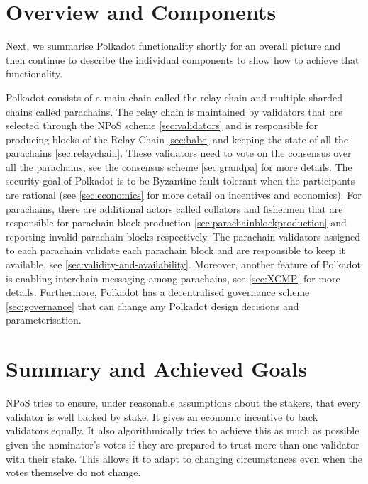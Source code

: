 \section{Overview and Components}\label{sec:components}
Next, we summarise Polkadot functionality shortly for an overall picture and then continue to describe the individual components to show how to achieve that functionality.

Polkadot consists of a main chain called the relay chain and multiple sharded chains called parachains. The relay chain is maintained by validators that are selected through the NPoS scheme \ref{sec:validators} and is responsible for producing blocks of the  Relay Chain \ref{sec:babe} and keeping the state of all the parachains \ref{sec:relaychain}.
These validators need to vote on the consensus over all the parachains, see the consensus scheme \ref{sec:grandpa} for more details.
The security goal of Polkadot is to be Byzantine fault tolerant when the participants are rational (see \ref{sec:economics} for more detail on incentives and economics).
For parachains, there are additional actors called collators and fishermen that are responsible for parachain block production \ref{sec:parachainblockproduction} and reporting invalid parachain blocks respectively.
The parachain validators assigned to each parachain validate each parachain block and are responsible to keep it available, see \ref{sec:validity-and-availability}. Moreover, another feature of Polkadot is enabling interchain messaging among parachains, see \ref{sec:XCMP} for more details.
Furthermore, Polkadot has a decentralised governance scheme \ref{sec:governance} that can change any Polkadot design decisions and parameterisation.










\section{Summary and Achieved Goals}


NPoS tries to ensure, under reasonable assumptions about the stakers, that every validator is well backed by stake. It gives an economic incentive to back validators equally. It also algorithmically tries to achieve this as much as possible given the nominator's votes if they are prepared to trust more than one validator with their stake.  This allows it to adapt to changing circumstances even when the votes themselve do not change.

